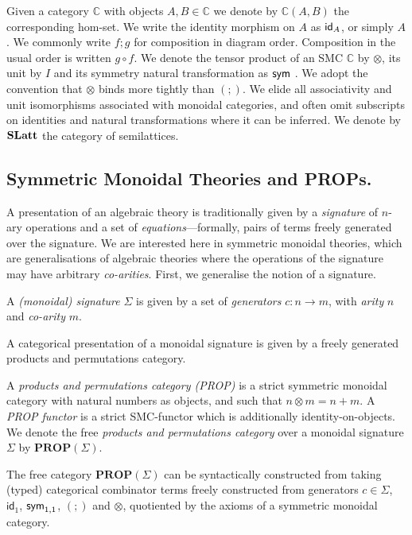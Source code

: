 Given a category $\mathbb{C}$  with objects $A,B \in \mathbb{C}$ we denote by $\mathbb{C}(A,B)$ the corresponding hom-set.  We write the identity morphism on $A$ as $\textsf{id}_A$,  or simply $A$.  We commonly write $f;g$ for composition in diagram order.  Composition in the usual order is written $g \circ f$.  
We denote the tensor product of an SMC $\mathbb{C}$ by $\otimes$,  its unit by $I$ and its symmetry natural transformation as $\textsf{sym}$ \cite{maclane}.  
We adopt the convention that $\otimes$ binds more tightly than $(;\!)$.  We elide all associativity and unit isomorphisms associated with monoidal categories,  and often omit subscripts on identities and natural transformations where it can be inferred.  We denote by $\mathbf{SLatt}$ the category of semilattices.  


\subsection{Symmetric Monoidal Theories and PROPs.}

A presentation of an algebraic theory is traditionally given by a \textit{signature} of $n$-ary operations and a set of \textit{equations}---formally,  pairs of terms freely generated over the signature.  We are interested here in symmetric monoidal theories, which are generalisations of algebraic theories where the operations of the signature may have arbitrary \textit{co-arities}.  First,  we generalise the notion of a signature. 
\begin{definition}
A \textit{(monoidal) signature} $\Sigma$ is given by a set of \textit{generators} $c: n \to m$,  with \textit{arity} $n$ and \textit{co-arity} $m$.  %
\end{definition}


A categorical presentation of a monoidal signature is given by a freely generated products and permutations category.  
\begin{definition}
A \textit{products and permutations category (PROP)} is a strict symmetric monoidal category with natural numbers as objects,  and such that $n \otimes m = n+m$.  A \textit{PROP functor} is a strict SMC-functor which is additionally identity-on-objects. 
We denote the free \textit{products and permutations category} over a monoidal signature $\Sigma$ by $\textbf{PROP}(\Sigma)$.  
\end{definition}
The free category $\textbf{PROP}(\Sigma)$ can be syntactically constructed from taking (typed) categorical combinator terms freely constructed from generators $c \in \Sigma$, $\textsf{id}_1$, $\textsf{sym}_{1,1}$, $(;\!)$ and $\otimes$, quotiented by the axioms of a symmetric monoidal category.  

